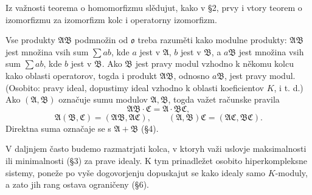 \documentclass[11pt]{article}
\providecommand{\mA}{\mathfrak{A}}
\providecommand{\mB}{\mathfrak{B}}
\providecommand{\mC}{\mathfrak{C}}
\providecommand{\mo}{\mathfrak{o}}
\begin{document}
Iz važnosti teorema o homomorfizmu slědujut, kako v §2, prvy i vtory teorem o izomorfizmu za izomorfizm kolc i operatorny izomorfizm.

Vse produkty $\mA\mB$ podmnožin od $\mo$ treba razuměti kako modulne produkty: $\mA\mB$ jest množina vsih sum $\sum ab$, kde $a$ jest v $\mA$, $b$ jest v $\mB$, a $a\mB$ jest množina vsih sum $\sum ab$, kde $b$ jest v $\mB$. Ako $\mB$ jest pravy modul vzhodno k někomu kolcu kako oblasti operatorov, togda i produkt $\mA\mB$, odnosno $a\mB$, jest pravy modul. (Osobito: pravy ideal, dopustimy ideal vzhodno k oblasti koeficientov $K$, i t. d.) Ako $(\mA,\mB)$ označuje sumu modulov $\mA,\mB$, togda važet računske pravila
\[
        \mA\mB\cdot\mC=\mA\cdot\mB\mC,
\]
\[
        \mA(\mB,\mC)=(\mA\mB,\mA\mC),
        \qquad
        (\mA,\mB)\mC=(\mA\mC,\mB\mC).
\]
Direktna suma označaje se s $\mA+\mB$ (§4).

V daljnjem často budemo razmatrjati kolca, v ktoryh važi uslovje maksimalnosti ili minimalnosti (§3) za prave idealy. K tym prinadležet osobito hiperkompleksne sistemy, poneže po vyše dogovorjenju dopuskajut se kako idealy samo $K$-moduly, a zato jih rang ostava ograničeny (§6).
\end{document}
